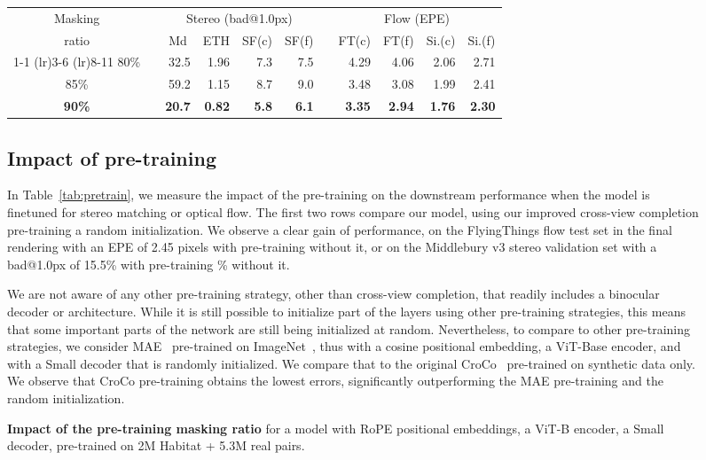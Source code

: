\documentclass[10pt,twocolumn,letterpaper]{article}
\begin{document}
\begin{figure}
{\begin{center}
\begin{table*}
\centering
\begin{tabular}{cp{0cm}rrrrp{0cm}rrrr}
     \toprule
Masking & & \multicolumn{4}{c}{Stereo (bad@1.0px)} & & \multicolumn{4}{c}{Flow (EPE)}  \\
ratio & & \multicolumn{1}{c}{\small Md} & \multicolumn{1}{c}{\small ETH} & \multicolumn{1}{c}{\small SF(c)} & \multicolumn{1}{c}{\small SF(f)} & & \multicolumn{1}{c}{\small FT(c)} & \multicolumn{1}{c}{\small FT(f)} & \multicolumn{1}{c}{\small Si.(c)} & \multicolumn{1}{c}{\small Si.(f)}  \\
\cmidrule(lr){1-1} \cmidrule(lr){3-6} \cmidrule(lr){8-11}
80\% & &   32.5 &  1.96 &   7.3 &   7.5 &    &   4.29 &  4.06 &  2.06 &  2.71 \\
85\% & &   59.2 &  1.15 &   8.7 &   9.0 &    &   3.48 &  3.08 &  1.99 &  2.41 \\
\bf{90\%} & &  \bf{20.7} &  \bf{0.82} &   \bf{5.8} &   \bf{6.1} &    &   \bf{3.35} &  \bf{2.94} &  \bf{1.76} &  \bf{2.30} \\
\bottomrule
\end{tabular}
\vspace{-0.3cm}
\caption{\textbf{Impact of the pre-training masking ratio} for a model with RoPE positional embeddings, a ViT-B encoder, a Small decoder, pre-trained on 2M Habitat + 5.3M real pairs.}
\label{tab:maskratio}
\end{table*}

\subsection{Impact of pre-training} 

In Table~\ref{tab:pretrain}, we measure the impact of the pre-training on the downstream performance when the model is finetuned for stereo matching or optical flow. The first two rows compare our model, using our improved cross-view completion pre-training \vs a random initialization. We observe a clear gain of performance, \eg on the FlyingThings flow test set in the final rendering with an EPE of 2.45 pixels with pre-training  without it, or on the Middlebury v3 stereo validation set with a bad@1.0px of 15.5\% with pre-training \% without it.

We are not aware of any other pre-training strategy, other than cross-view completion, that readily includes a binocular decoder or architecture. While it is still possible to initialize part of the layers using other pre-training strategies, this means that some important parts of the network are still being initialized at random. Nevertheless, to compare to other pre-training strategies, we consider MAE~\cite{mae} pre-trained on ImageNet~\cite{imagenet}, thus with a cosine positional embedding, a ViT-Base encoder, and with a Small decoder that is randomly initialized. We compare that to the original CroCo~\cite{croco} pre-trained on synthetic data only. We observe that CroCo pre-training obtains the lowest errors, significantly outperforming the MAE pre-training and the random initialization.


\end{center}}
\end{figure}
\end{document}
